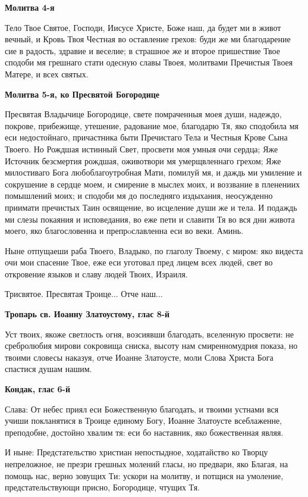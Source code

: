 \medskip
\bfseries Молитва 4-я\normalfont{}\nopagebreak


Тело Твое Святое, Господи, Иисусе Христе, Боже наш, да будет ми в живот вечный, и Кровь Твоя Честная во оставление грехов: буди же ми благодарение сие в радость, здравие и веселие; в страшное же и второе пришествие Твое сподоби мя грешнаго стати одесную славы Твоея, молитвами Пречистыя Твоея Матере, и всех святых.


\medskip
\bfseries Молитва 5-я, ко Пресвятой Богородице\normalfont{}\nopagebreak


Пресвятая Владычице Богородице, свете помраченныя моея души, надеждо, покрове, прибежище, утешение, радование мое, благодарю Тя, яко сподобила мя еси недостойнаго, причастника быти Пречистаго Тела и Честныя Крове Сына Твоего. Но Рождшая истинный Свет, просвети моя умныя очи сердца; Яже Источник безсмертия рождшая, оживотвори мя умерщвленнаго грехом; Яже милостиваго Бога любоблагоутробная Мати, помилуй мя, и даждь ми умиление и сокрушение в сердце моем, и смирение в мыслех моих, и воззвание в пленениих помышлений моих; и сподоби мя до последняго издыхания, неосужденно приимати пречистых Таин освящение, во исцеление души же и тела. И подаждь ми слезы покаяния и исповедания, во еже пети и славити Тя во вся дни живота моего, яко благословенна и препрoславленна еси во веки. Аминь.


Ныне отпущаеши раба Твоего, Владыко, по глаголу Твоему, с миром: яко видеста очи мои спасение Твое, еже еси уготовал пред лицем всех людей, свет во откровение языков и славу людей Твоих, Израиля.


Трисвятое. Пресвятая Троице... Отче наш...




\medskip
\bfseries Тропарь св. Иоанну Златоустому, глас 8-й\normalfont{}\nopagebreak


Уст твоих, якоже светлость огня, возсиявши благодать, вселенную просвети: не сребролюбия мирови сокровища сниска, высоту нам смиренномудрия показа, но твоими словесы наказуя, отче Иоанне Златоусте, моли Слова Христа Бога спастися душам нашим.


\medskip
\bfseries Кондак, глас 6-й\normalfont{}\nopagebreak


Слава: От небес приял еси Божественную благодать, и твоими устнами вся учиши покланятися в Троице единому Богу, Иоанне Златоусте всеблаженне, преподобне, достойно хвалим тя: еси бо наставник, яко божественная являя.


И ныне: Предстательство христиан непостыдное, ходатайство ко Творцу непреложное, не презри грешных молений гласы, но предвари, яко Благая, на помощь нас, верно зовущих Ти: ускори на молитву, и потщися на умоление, предстательствующи присно, Богородице, чтущих Тя.


